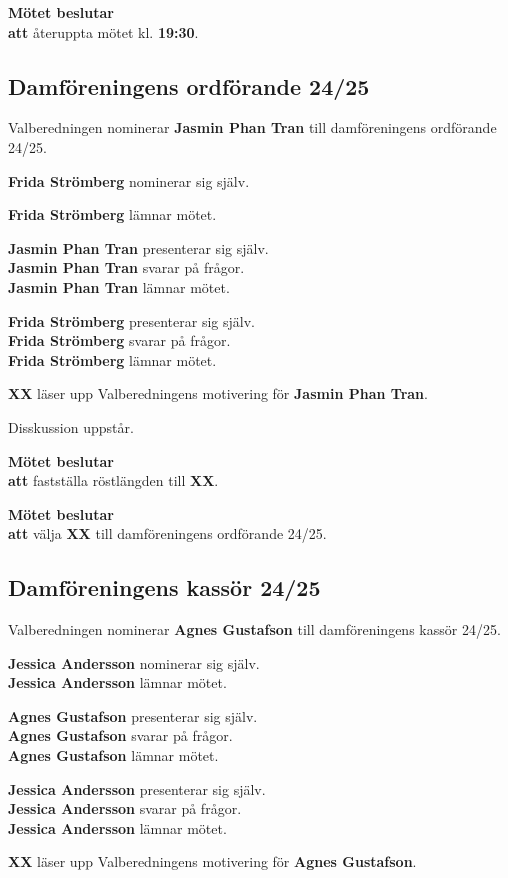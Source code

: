 \documentclass{datateknologsektionen-document}
\newcommand{\ind}{\hspace*{2em}}
\newcommand{\motetbeslutar}{\textbf{Mötet beslutar}}
\newcommand{\att}{\\\ind\textbf{att}}
\newcommand{\rostlangd}[1]{\motetbeslutar\att{} fastställa röstlängden till \textbf{#1}.}
\begin{document}
\motetbeslutar\att{} återuppta mötet kl. \textbf{19:30}.

\subsection{Damföreningens ordförande 24/25}

Valberedningen nominerar \textbf{Jasmin Phan Tran} till damföreningens ordförande 24/25.

\textbf{Frida Strömberg} nominerar sig själv.

\textbf{Frida Strömberg} lämnar mötet.

\textbf{Jasmin Phan Tran} presenterar sig själv.\\
\textbf{Jasmin Phan Tran} svarar på frågor.\\
\textbf{Jasmin Phan Tran} lämnar mötet.

\textbf{Frida Strömberg} presenterar sig själv.\\
\textbf{Frida Strömberg} svarar på frågor.\\
\textbf{Frida Strömberg} lämnar mötet.

\textbf{XX} läser upp Valberedningens motivering för \textbf{Jasmin Phan Tran}.

Disskussion uppstår.

\rostlangd{XX}

\motetbeslutar\att{} välja \textbf{XX} till damföreningens ordförande 24/25.

\subsection{Damföreningens kassör 24/25}

Valberedningen nominerar \textbf{Agnes Gustafson} till damföreningens kassör 24/25.

\textbf{Jessica Andersson} nominerar sig själv. \\
\textbf{Jessica Andersson} lämnar mötet.

\textbf{Agnes Gustafson} presenterar sig själv.\\
\textbf{Agnes Gustafson} svarar på frågor.\\
\textbf{Agnes Gustafson} lämnar mötet.

\textbf{Jessica Andersson} presenterar sig själv.\\
\textbf{Jessica Andersson} svarar på frågor.\\
\textbf{Jessica Andersson} lämnar mötet.

\textbf{XX} läser upp Valberedningens motivering för \textbf{Agnes Gustafson}.
\end{document}
